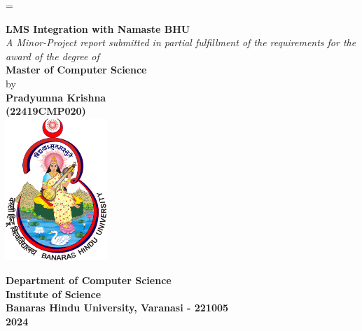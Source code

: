 \thispagestyle{empty} %
\emergencystretch=\maxdimen
{}

\begin{titlepage}
{
	\thispagestyle{empty}
	\centering
	\large

    \vspace*{0cm}
	\textbf{\LARGE LMS Integration with Namaste BHU}
    \\[0.5cm]
    \textit{A Minor-Project report submitted in partial fulfillment of the requirements for the award of the degree of}
	\\[1.5cm]
    \textbf{Master of Computer Science}
    \\[1.5cm]
    by
    \\[1.5cm]
    {\bf Pradyumna Krishna}\\
    {\bf (22419CMP020)}\\[1.5cm]
    
    \includegraphics[width=1.5in]{assets/img/emblem.png}
    \vspace*{\fill}

    \bf \Large
    Department of Computer Science\\
    Institute of Science\\
    \LARGE
    Banaras Hindu University, Varanasi - 221005\\
    \Large
    2024\\[1.5cm]
}
\end{titlepage}
